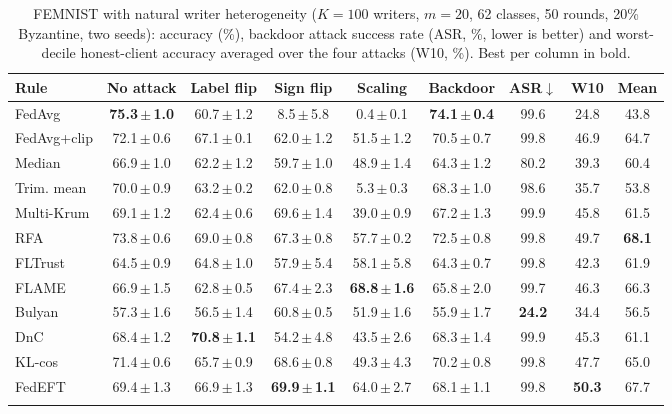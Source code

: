 \begin{table}[!tbp]
\centering
\caption{FEMNIST with natural writer heterogeneity ($K=100$ writers, $m=20$, 62 classes, 50 rounds, 20\% Byzantine, two seeds): accuracy (\%), backdoor attack success rate (ASR, \%, lower is better) and worst-decile honest-client accuracy averaged over the four attacks (W10, \%). Best per column in bold.}
\label{tab:femnist}
\setlength{\tabcolsep}{3.2pt}
\footnotesize
\begin{tabular}{@{}lcccccccc@{}}
\toprule
Rule & No attack & Label flip & Sign flip & Scaling & Backdoor & ASR$\downarrow$ & W10 & \textbf{Mean}\\
\midrule
FedAvg & \textbf{75.3\,$\pm$\,1.0} & 60.7\,$\pm$\,1.2 & 8.5\,$\pm$\,5.8 & 0.4\,$\pm$\,0.1 & \textbf{74.1\,$\pm$\,0.4} & 99.6 & 24.8 & 43.8\\
FedAvg+clip & 72.1\,$\pm$\,0.6 & 67.1\,$\pm$\,0.1 & 62.0\,$\pm$\,1.2 & 51.5\,$\pm$\,1.2 & 70.5\,$\pm$\,0.7 & 99.8 & 46.9 & 64.7\\
Median & 66.9\,$\pm$\,1.0 & 62.2\,$\pm$\,1.2 & 59.7\,$\pm$\,1.0 & 48.9\,$\pm$\,1.4 & 64.3\,$\pm$\,1.2 & 80.2 & 39.3 & 60.4\\
Trim. mean & 70.0\,$\pm$\,0.9 & 63.2\,$\pm$\,0.2 & 62.0\,$\pm$\,0.8 & 5.3\,$\pm$\,0.3 & 68.3\,$\pm$\,1.0 & 98.6 & 35.7 & 53.8\\
Multi-Krum & 69.1\,$\pm$\,1.2 & 62.4\,$\pm$\,0.6 & 69.6\,$\pm$\,1.4 & 39.0\,$\pm$\,0.9 & 67.2\,$\pm$\,1.3 & 99.9 & 45.8 & 61.5\\
RFA & 73.8\,$\pm$\,0.6 & 69.0\,$\pm$\,0.8 & 67.3\,$\pm$\,0.8 & 57.7\,$\pm$\,0.2 & 72.5\,$\pm$\,0.8 & 99.8 & 49.7 & \textbf{68.1}\\
FLTrust & 64.5\,$\pm$\,0.9 & 64.8\,$\pm$\,1.0 & 57.9\,$\pm$\,5.4 & 58.1\,$\pm$\,5.8 & 64.3\,$\pm$\,0.7 & 99.8 & 42.3 & 61.9\\
FLAME & 66.9\,$\pm$\,1.5 & 62.8\,$\pm$\,0.5 & 67.4\,$\pm$\,2.3 & \textbf{68.8\,$\pm$\,1.6} & 65.8\,$\pm$\,2.0 & 99.7 & 46.3 & 66.3\\
Bulyan & 57.3\,$\pm$\,1.6 & 56.5\,$\pm$\,1.4 & 60.8\,$\pm$\,0.5 & 51.9\,$\pm$\,1.6 & 55.9\,$\pm$\,1.7 & \textbf{24.2} & 34.4 & 56.5\\
DnC & 68.4\,$\pm$\,1.2 & \textbf{70.8\,$\pm$\,1.1} & 54.2\,$\pm$\,4.8 & 43.5\,$\pm$\,2.6 & 68.3\,$\pm$\,1.4 & 99.9 & 45.3 & 61.1\\
KL-cos & 71.4\,$\pm$\,0.6 & 65.7\,$\pm$\,0.9 & 68.6\,$\pm$\,0.8 & 49.3\,$\pm$\,4.3 & 70.2\,$\pm$\,0.8 & 99.8 & 47.7 & 65.0\\
\midrule
FedEFT & 69.4\,$\pm$\,1.3 & 66.9\,$\pm$\,1.3 & \textbf{69.9\,$\pm$\,1.1} & 64.0\,$\pm$\,2.7 & 68.1\,$\pm$\,1.1 & 99.8 & \textbf{50.3} & 67.7\\
\botrule
\end{tabular}
\end{table}
